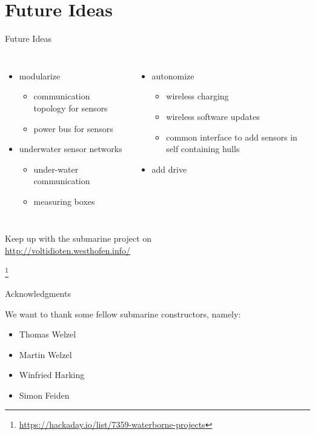 \documentclass{beamer}
\begin{document}
	\section{Future Ideas}
	\begin{frame}{Future Ideas}
		\begin{columns}
			\begin{itemize}
				\item modularize
					\begin{itemize}
						\item communication topology for sensors
						\item power bus for sensors
					\end{itemize}
				\item underwater sensor networks
					\begin{itemize}
						\item under-water communication
						\item measuring boxes
					\end{itemize}
			\end{itemize}
			\begin{itemize}
				\item autonomize
					\begin{itemize}
						\item wireless charging
						\item wireless software updates
						\item common interface to add sensors in self containing hulls
					\end{itemize}
				\item add drive
			\end{itemize}
		\end{columns}
		\begin{mdframed}
			\begin{center}
				Keep up with the submarine project on\\
				\url{http://voltidioten.westhofen.info/}
			\end{center}
		\end{mdframed}
		\let\thefootnote\relax\footnote{\url{https://hackaday.io/list/7359-waterborne-projects}}
	\end{frame}

	\begin{frame}{Acknowledgments}
		\begin{center}
			We want to thank some fellow submarine constructors, namely:
		\end{center}
		\begin{itemize}
			\item Thomas Welzel
			\item Martin Welzel
			\item Winfried Harking
			\item Simon Feiden
		\end{itemize}
	\end{frame}
\end{document}

